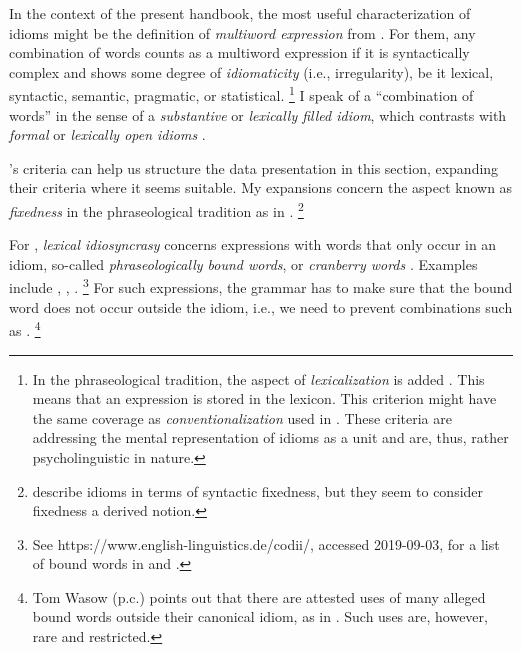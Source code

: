 \documentclass[output=paper
                ,modfonts
                ,nonflat
	        ,collection
	        ,collectionchapter
	        ,collectiontoclongg
 	        ,biblatex
                ,babelshorthands
                ,newtxmath
                ,draftmode
                ,colorlinks, citecolor=brown
]{./langsci/langscibook}
\begin{document}
In the context of the present handbook, the most useful characterization of idioms might be the definition of \emph{multiword expression} from  \citet{Baldwin:Kim:10}.
For them, any combination of words counts as a multiword expression if it is syntactically complex and shows some degree of \emph{idiomaticity} (i.e., irregularity), be it lexical, syntactic, semantic, pragmatic, or statistical.%
\footnote{In the phraseological tradition, the aspect of \emph{lexicalization} is added \citep{Fleischer97a-u,Burger:98}. This means that an expression is stored in the lexicon. This criterion might have the same coverage as \emph{conventionalization} used in \citet{NSW94a}. 
These criteria are addressing the mental representation of idioms as a unit and are, thus, rather psycholinguistic in nature.}
%
I speak of a ``combination of words'' in the sense of a \emph{substantive} or \emph{lexically filled idiom}, which 
contrasts with \emph{formal} or \emph{lexically open idioms} \citep[505]{FKoC88a}. 

\citeauthor{Baldwin:Kim:10}'s criteria can help us structure the data presentation in this section, expanding their criteria where it seems suitable.
My expansions concern the aspect known as \emph{fixedness} in the phraseological tradition as in \citet{Fleischer97a-u}.%
\footnote{\citet{Baldwin:Kim:10} describe idioms in terms of syntactic fixedness, but they seem to consider fixedness a derived notion.}


For \citet{Baldwin:Kim:10}, \emph{lexical idiosyncrasy} concerns expressions with words that only occur in an idiom, so-called \emph{phraseologically bound words}, or \emph{cranberry words} \citep{Aronoff76a-u}. Examples include , 
,
.%
\footnote{
See https://www.english-linguistics.de/codii/, accessed 2019-09-03, for a list of bound words in  and  \citep{Trawinski:al:08lrec}.}
For such expressions, the grammar has to make sure that the bound word does not occur outside the idiom, i.e., we need to prevent combinations such as .%
\footnote{Tom Wasow (p.c.) points out that there are attested uses of many alleged bound words outside their canonical idiom, as in . Such uses are, however, rare and restricted.
\z 

}
\end{document}
